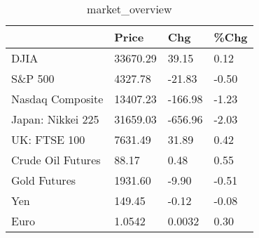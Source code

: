 \documentclass{article}%
\begin{document}
%


\begin{table}[htbp]%
\caption{market\_overview}%
\centering%
\begin{adjustbox}{width=1\textwidth}%
\begin{tabular}{llll}
\toprule
                  &    Price &     Chg &  \%Chg \\
\midrule
             DJIA & 33670.29 &   39.15 &  0.12 \\
          S\&P 500 &  4327.78 &  -21.83 & -0.50 \\
 Nasdaq Composite & 13407.23 & -166.98 & -1.23 \\
Japan: Nikkei 225 & 31659.03 & -656.96 & -2.03 \\
     UK: FTSE 100 &  7631.49 &   31.89 &  0.42 \\
Crude Oil Futures &    88.17 &    0.48 &  0.55 \\
     Gold Futures &  1931.60 &   -9.90 & -0.51 \\
              Yen &   149.45 &   -0.12 & -0.08 \\
             Euro &   1.0542 &  0.0032 &  0.30 \\
\bottomrule
\end{tabular}
%
\end{adjustbox}%
\end{table}

%
\end{document}
